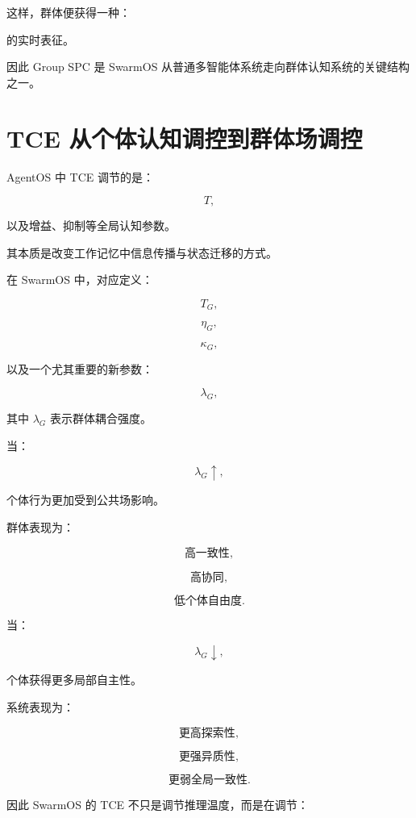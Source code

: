 这样，群体便获得一种：

\begin{statementbox}
\centering
{}
\end{statementbox}

的实时表征。

因此 Group SPC 是 SwarmOS 从普通多智能体系统走向群体认知系统的关键结构之一。


\section{TCE 从个体认知调控到群体场调控}

AgentOS 中 TCE 调节的是：

\[
T,
\]

以及增益、抑制等全局认知参数。

其本质是改变工作记忆中信息传播与状态迁移的方式。

在 SwarmOS 中，对应定义：

\[
T_G,
\]

\[
\eta_G,
\]

\[
\kappa_G,
\]

以及一个尤其重要的新参数：

\[
\lambda_G,
\]

其中 $\lambda_G$ 表示群体耦合强度。

当：

\[
\lambda_G
\uparrow,
\]

个体行为更加受到公共场影响。

群体表现为：

\[
\text{高一致性},
\]

\[
\text{高协同},
\]

\[
\text{低个体自由度}.
\]

当：

\[
\lambda_G
\downarrow,
\]

个体获得更多局部自主性。

系统表现为：

\[
\text{更高探索性},
\]

\[
\text{更强异质性},
\]

\[
\text{更弱全局一致性}.
\]

因此 SwarmOS 的 TCE 不只是调节推理温度，而是在调节：

\begin{statementbox}
\centering
{}
\end{statementbox}

